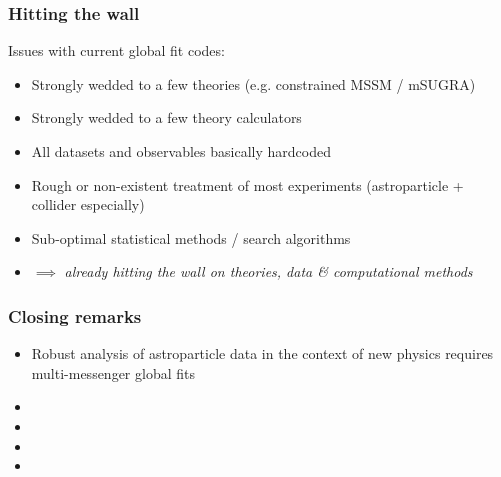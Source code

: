 \documentclass[xcolor=dvipsnames]{beamer}
\begin{document}
\begin{frame}
\frametitle{Hitting the wall}

Issues with current global fit codes:
\begin{itemize}
\item Strongly wedded to a few theories (e.g. constrained MSSM / mSUGRA)
\item Strongly wedded to a few theory calculators
\item All datasets and observables basically hardcoded
\item Rough or non-existent treatment of most experiments (astroparticle + collider especially)
\item Sub-optimal statistical methods / search algorithms
\item $\implies$ \textit{already hitting the wall on theories, data \& computational methods}
\end{itemize}

\end{frame}

\begin{frame}
\frametitle{Closing remarks}

\begin{itemize}
\item{Robust analysis of astroparticle data in the context of new physics requires multi-messenger global fits}
\item{}
\item{}
\item{}
\item{}
\end{itemize}


\end{frame}
\end{document}
